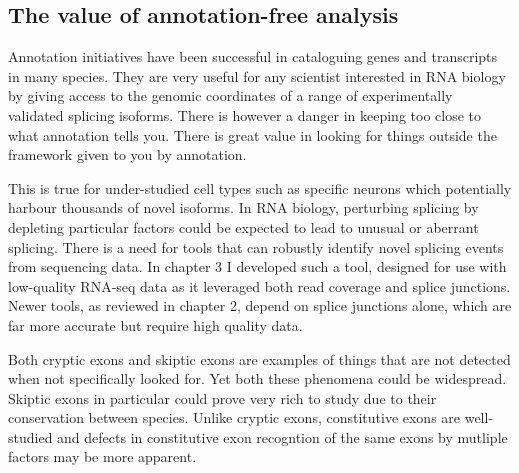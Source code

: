 

\subsection{The value of annotation-free analysis}

Annotation initiatives have been successful in cataloguing genes and transcripts in many species.
They are very useful for any scientist interested in RNA biology by giving access to the genomic coordinates of a range of experimentally validated splicing isoforms.
There is however a danger in keeping too close to what annotation tells you.
There is great value in looking for things outside the framework given to you by annotation.

This is true for under-studied cell types such as specific neurons which potentially harbour thousands of novel isoforms. %
In RNA biology, perturbing splicing by depleting particular factors could be expected to lead to unusual or aberrant splicing.
There is a need for tools that can robustly identify novel splicing events from sequencing data. 
In chapter 3 I developed such a tool, designed for use with low-quality RNA-seq data as it leveraged both read coverage and splice junctions.
Newer tools, as reviewed in chapter 2, depend on splice junctions alone, which are far more accurate but require high quality data.

Both cryptic exons and skiptic exons are examples of things that are not detected when not specifically looked for.
Yet both these phenomena could be widespread. 
Skiptic exons in particular could prove very rich to study due to their conservation between species. 
Unlike cryptic exons, constitutive exons are well-studied and defects in constitutive exon recogntion of the same exons by mutliple factors may be more apparent.

